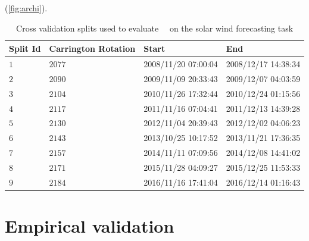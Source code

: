 (\cref{fig:archi}). 
%
\begin{table}[ht]
  \centering
  \caption{Cross validation splits used to evaluate \ \XX \ on the solar wind forecasting task}
  \label{table:dtlrsplits}
  \begin{tabular}{llll}
  \hline
  \textbf{Split Id} & \textbf{Carrington Rotation} & \textbf{Start} & \textbf{End}\\ \hline
  $1$ & $2077$ & 2008/11/20 07:00:04 & 2008/12/17 14:38:34  \\
  $2$ & $2090$ & 2009/11/09 20:33:43 & 2009/12/07 04:03:59  \\
  $3$ & $2104$ & 2010/11/26 17:32:44 & 2010/12/24 01:15:56  \\
  $4$ & $2117$ & 2011/11/16 07:04:41 & 2011/12/13 14:39:28  \\
  $5$ & $2130$ & 2012/11/04 20:39:43 & 2012/12/02 04:06:23  \\
  $6$ & $2143$ & 2013/10/25 10:17:52 & 2013/11/21 17:36:35  \\
  $7$ & $2157$ & 2014/11/11 07:09:56 & 2014/12/08 14:41:02  \\
  $8$ & $2171$ & 2015/11/28 04:09:27 & 2015/12/25 11:53:33  \\
  $9$ & $2184$ & 2016/11/16 17:41:04 & 2016/12/14 01:16:43  \\
  \hline
  \end{tabular}
  \end{table}
%


\section{Empirical validation}\label{sec:proofconcept}

